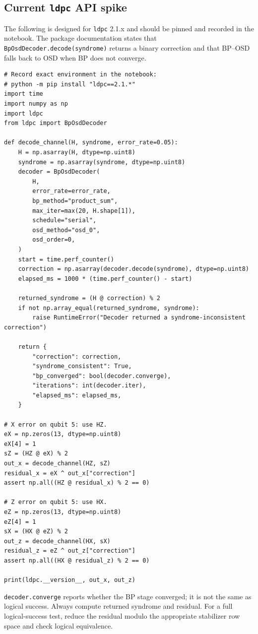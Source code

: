 \documentclass[11pt]{article}
\begin{document}
\subsection{Current \texttt{ldpc} API spike}

The following is designed for \texttt{ldpc} 2.1.x and should be pinned and recorded in the notebook.
The package documentation states that \texttt{BpOsdDecoder.decode(syndrome)} returns a binary
correction and that BP--OSD falls back to OSD when BP does not converge.

\begin{lstlisting}[style=python]
# Record exact environment in the notebook:
# python -m pip install "ldpc==2.1.*"
import time
import numpy as np
import ldpc
from ldpc import BpOsdDecoder

def decode_channel(H, syndrome, error_rate=0.05):
    H = np.asarray(H, dtype=np.uint8)
    syndrome = np.asarray(syndrome, dtype=np.uint8)
    decoder = BpOsdDecoder(
        H,
        error_rate=error_rate,
        bp_method="product_sum",
        max_iter=max(20, H.shape[1]),
        schedule="serial",
        osd_method="osd_0",
        osd_order=0,
    )
    start = time.perf_counter()
    correction = np.asarray(decoder.decode(syndrome), dtype=np.uint8)
    elapsed_ms = 1000 * (time.perf_counter() - start)

    returned_syndrome = (H @ correction) % 2
    if not np.array_equal(returned_syndrome, syndrome):
        raise RuntimeError("Decoder returned a syndrome-inconsistent correction")

    return {
        "correction": correction,
        "syndrome_consistent": True,
        "bp_converged": bool(decoder.converge),
        "iterations": int(decoder.iter),
        "elapsed_ms": elapsed_ms,
    }

# X error on qubit 5: use HZ.
eX = np.zeros(13, dtype=np.uint8)
eX[4] = 1
sZ = (HZ @ eX) % 2
out_x = decode_channel(HZ, sZ)
residual_x = eX ^ out_x["correction"]
assert np.all((HZ @ residual_x) % 2 == 0)

# Z error on qubit 5: use HX.
eZ = np.zeros(13, dtype=np.uint8)
eZ[4] = 1
sX = (HX @ eZ) % 2
out_z = decode_channel(HX, sX)
residual_z = eZ ^ out_z["correction"]
assert np.all((HX @ residual_z) % 2 == 0)

print(ldpc.__version__, out_x, out_z)
\end{lstlisting}

\begin{warningbox}
\texttt{decoder.converge} reports whether the BP stage converged; it is not the same as logical
success. Always compute returned syndrome and residual. For a full logical-success test, reduce the
residual modulo the appropriate stabilizer row space and check logical equivalence.
\end{warningbox}
\end{document}
